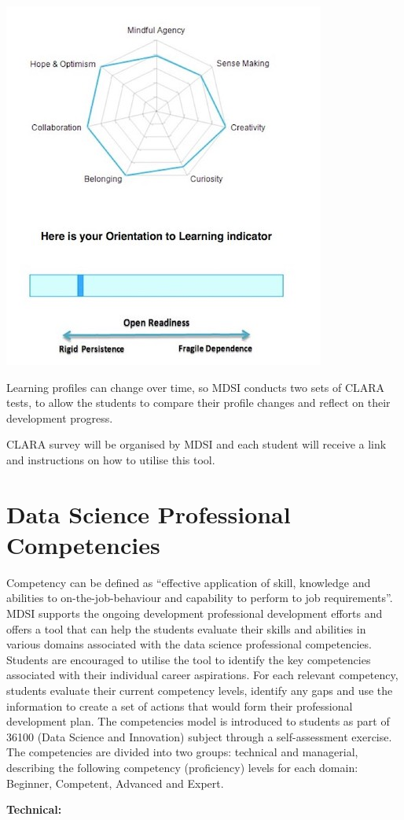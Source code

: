 \documentclass[]{book}
\theoremstyle{definition}
\theoremstyle{definition}
\theoremstyle{remark}
\begin{document}
\includegraphics[width=0.5\linewidth]{Images/Clara}

Learning profiles can change over time, so MDSI conducts two sets of
CLARA tests, to allow the students to compare their profile changes and
reflect on their development progress.

CLARA survey will be organised by MDSI and each student will receive a
link and instructions on how to utilise this tool.

\section{Data Science Professional
Competencies}\label{data-science-professional-competencies}

Competency can be defined as ``effective application of skill, knowledge
and abilities to on-the-job-behaviour and capability to perform to job
requirements''. MDSI supports the ongoing development professional
development efforts and offers a tool that can help the students
evaluate their skills and abilities in various domains associated with
the data science professional competencies. Students are encouraged to
utilise the tool to identify the key competencies associated with their
individual career aspirations. For each relevant competency, students
evaluate their current competency levels, identify any gaps and use the
information to create a set of actions that would form their
professional development plan. The competencies model is introduced to
students as part of 36100 (Data Science and Innovation) subject through
a self-assessment exercise. The competencies are divided into two
groups: technical and managerial, describing the following competency
(proficiency) levels for each domain: Beginner, Competent, Advanced and
Expert.

\textbf{Technical:}
\end{document}
